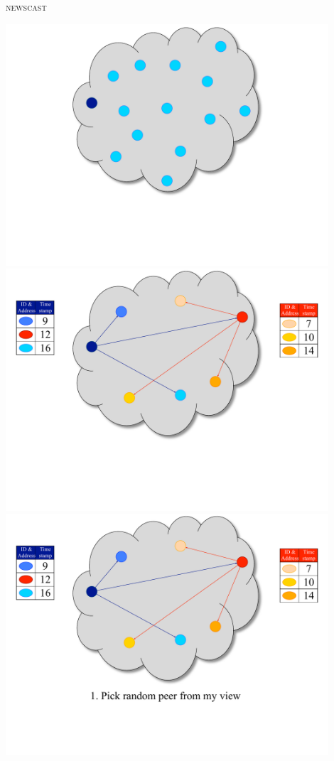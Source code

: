\begin{frame}{\textsc{newscast}}
	
\begin{overprint}
\includegraphics[width=0.9\textwidth]{1_newscast}
\includegraphics[width=0.9\textwidth]{2_newscast}
\includegraphics[width=0.9\textwidth]{3_newscast}

\end{overprint}
\end{frame}

